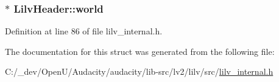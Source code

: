 \subsubsection[{\texorpdfstring{world}{world}}]{$\ast$ Lilv\+Header\+::world}\hypertarget{struct_lilv_header_accd62b6164586c0c3c128d3394ef3160}{}\label{struct_lilv_header_accd62b6164586c0c3c128d3394ef3160}


Definition at line 86 of file lilv\+\_\+internal.\+h.



The documentation for this struct was generated from the following file\+:\begin{DoxyCompactItemize}
\item 
C\+:/\+\_\+dev/\+Open\+U/\+Audacity/audacity/lib-\/src/lv2/lilv/src/\hyperlink{lilv__internal_8h}{lilv\+\_\+internal.\+h}\end{DoxyCompactItemize}
